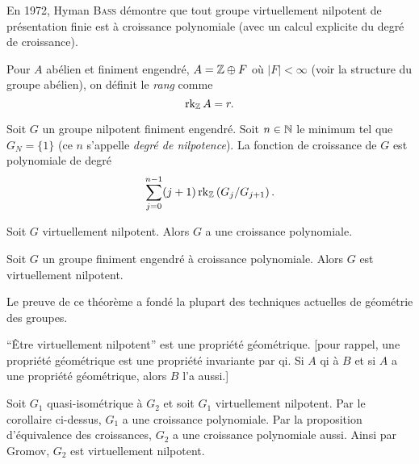     
    En 1972, Hyman \textsc{Bass} démontre que tout groupe virtuellement nilpotent de présentation finie est à
    croissance polynomiale (avec un calcul explicite du degré de croissance).

    \begin{defi}  
      Pour $A$ abélien et finiment engendré, $A = \mathbb{Z} \oplus F$ où $|F| < \infty$ (voir
      la structure du groupe abélien), on définit le \emph{rang} comme 
        \[\operatorname{rk}_{\mathbb{Z}} A = r.\]
    \end{defi}


    \begin{theo}  
      Soit $G$ un groupe nilpotent finiment engendré. Soit $n \in \mathbb{N}$ le minimum tel que $G_N = \{1\}$ (ce $n$
      s'appelle \emph{degré de nilpotence}). La fonction de croissance de $G$ est polynomiale de degré
        \[\sum_{j=0}^{n-1}(j+1)\operatorname{rk}_{\mathbb{Z}}\left(G_j/G_{j+1}\right).\]
    \end{theo}

    \begin{cor}
      Soit $G$ virtuellement nilpotent. Alors $G$ a une croissance polynomiale.
    \end{cor}

    \begin{theo} 
      Soit $G$ un groupe finiment engendré à croissance polynomiale. Alors $G$ est virtuellement nilpotent.
    \end{theo}

    Le preuve de ce théorème a fondé la plupart des techniques actuelles de géométrie des groupes.

    \begin{cor}
      ``Être virtuellement nilpotent'' est une propriété géométrique. {\normalfont \small[pour rappel, une propriété
        géométrique est une propriété invariante par qi. Si $A$ qi à $B$ et si $A$ a une propriété
        géométrique, alors $B$ l'a aussi.]}
    \end{cor}

    \begin{preuve}
      Soit $G_1$ quasi-isométrique à $G_2$ et soit $G_1$ virtuellement nilpotent. Par le corollaire ci-dessus,
      $G_1$ a une croissance polynomiale. Par la proposition d'équivalence des croissances, $G_2$ a une
      croissance polynomiale aussi. Ainsi par Gromov, $G_2$ est virtuellement nilpotent.
    \end{preuve}


